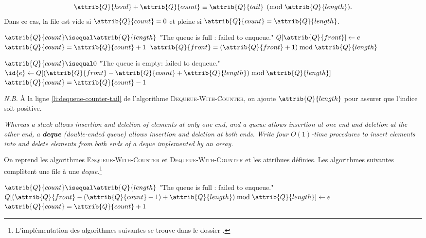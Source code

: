 \begin{description}
\begin{ex}
\begin{enumerate}[label=\circled{\arabic*}]
        \[\attrib{Q}{head} + \attrib{Q}{count}\equiv \attrib{Q}{tail}\pmod{\attrib{Q}{length}}.\]
    Dans ce cas, la file est vide si $\attrib{Q}{count} = 0$ et pleine si $\attrib{Q}{count} = \attrib{Q}{length}$. 
\begin{codebox}
    \li \If $\attrib{Q}{count}\isequal\attrib{Q}{length}$ \Then
        \li \Error "The queue is full : failed to enqueue." \End
    \li  $Q[\attrib{Q}{front}] \gets e$ 
    \li $\attrib{Q}{count} = \attrib{Q}{count}+1$
    \li $\attrib{Q}{front} = (\attrib{Q}{front}+1)\bmod \attrib{Q}{length}$
\end{codebox}
\begin{codebox}
    \li \If $\attrib{Q}{count}\isequal0$ \Then
        \li \Error "The queue is empty: failed to dequeue." \End
    \li  $\id{e} \gets Q[(\attrib{Q}{front} - \attrib{Q}{count} + \attrib{Q}{length}) \bmod \attrib{Q}{length}]$ \label{li:dequeue-counter-tail}
    \li  $\attrib{Q}{count} = \attrib{Q}{count}-1$
    \li \Return {}
\end{codebox}
\textit{N.B.} À la ligne \ref{li:dequeue-counter-tail} de l'algorithme \textsc{Dequeue-With-Counter}, on ajoute $\attrib{Q}{length}$ pour assurer que l'indice soit positive. 
  \end{enumerate} 
\end{ex}
 \textit{Whereas a stack allows insertion and deletion of elements at only one end, and a queue allows insertion at one end and deletion at the other end, a \textbf{deque} (double-ended queue) allows insertion and deletion at both ends. Write four $O(1)$-time procedures to insert elements into and delete elements from both ends of a deque implemented by an array.}
\begin{ex}
   On reprend les algorithmes \textsc{Enqueue-With-Counter} et \textsc{Dequeue-With-Counter} et les attribues définies. Les algorithmes suivantes complètent une file à une \textit{deque}.\footnote{L'implémentation des algorithmes suivantes se trouve dans le dossier .}
\begin{codebox}
    \li \If $\attrib{Q}{count}\isequal\attrib{Q}{length}$ \Then
        \li \Error "The queue is full : failed to enqueue." \End
    \li  $Q[(\attrib{Q}{front} - (\attrib{Q}{count} + 1) + \attrib{Q}{length}) \bmod \attrib{Q}{length}] \gets e$ 
    \li $\attrib{Q}{count} = \attrib{Q}{count}+1$

\end{codebox}
\end{ex}
\end{description}
